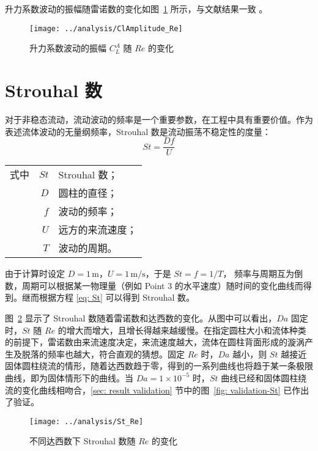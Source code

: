 升力系数波动的振幅随雷诺数的变化如图~\ref{fig: ClAmplitude} 所示，与文献结果一致 \cite{Park1998}。

\begin{figure}
	\centering
	\texttt{[image: ../analysis/ClAmplitude\_Re]}
	\caption{升力系数波动的振幅 $C_L^A$ 随 $Re$ 的变化}
	\label{fig: ClAmplitude}
\end{figure}

\section{Strouhal 数}\label{sec: St}

对于非稳态流动，流动波动的频率是一个重要参数，在工程中具有重要价值。作为表述流体波动的无量纲频率，Strouhal 数是流动振荡不稳定性的度量：
\begin{equation}\label{eq: St}
	St = \frac{Df}{U}
\end{equation}
\begin{tabularx}{\textwidth}{@{}l@{\quad}r@{——}X@{}}
	式中 & $St$ & Strouhal 数；\\
		& $D$ & 圆柱的直径；\\
		& $f$ & 波动的频率；\\
		& $U$ & 远方的来流速度；\\
		& $T$ & 波动的周期。 
\end{tabularx}\vspace{3.15bp}
由于计算时设定 $D=1\,\mathrm{m}$，$U=1\,\mathrm{m/s}$，于是 $St=f=1/T$，
频率与周期互为倒数，周期可以根据某一物理量（例如 Point 3 的水平速度）随时间的变化曲线而得到。继而根据方程 \eqref{eq: St} 可以得到 Strouhal 数。%

图~\ref{fig: St} 显示了 Strouhal 数随着雷诺数和达西数的变化。从图中可以看出，$Da$ 固定时，$St$ 随 $Re$ 的增大而增大，且增长得越来越缓慢。在指定圆柱大小和流体种类的前提下，雷诺数由来流速度决定，来流速度越大，流体在圆柱背面形成的漩涡产生及脱落的频率也越大，符合直观的猜想。固定 $Re$ 时，$Da$ 越小，则 $St$ 越接近固体圆柱绕流的情形，随着达西数趋于零，得到的一系列曲线也将趋于某一条极限曲线，即为固体情形下的曲线。当 $Da=1 \times 10^{-5}$ 时，$St$ 曲线已经和固体圆柱绕流的变化曲线相吻合，\ref{sec: result validation} 节中的图~\ref{fig: validation-St} 已作出了验证。

\begin{figure}
	\centering
	\texttt{[image: ../analysis/St\_Re]}
	\caption{不同达西数下 Strouhal 数随 $Re$ 的变化}
	\label{fig: St}
\end{figure}


